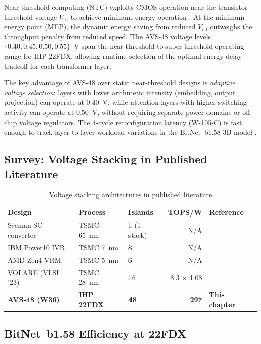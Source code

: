 Near-threshold computing (NTC) exploits CMOS operation near the
transistor threshold voltage $V_\mathrm{th}$ to achieve minimum-energy
operation \cite{dreslinski_near_threshold_2010}.  At the minimum-energy
point (MEP), the dynamic energy saving from reduced $V_\mathrm{dd}$
outweighs the throughput penalty from reduced speed.  The AVS-48
voltage levels $\{0.40, 0.45, 0.50, 0.55\}$~V span the near-threshold
to super-threshold operating range for IHP 22FDX, allowing runtime
selection of the optimal energy-delay tradeoff for each transformer layer.

The key advantage of AVS-48 over static near-threshold designs is
\emph{adaptive voltage selection}: layers with lower arithmetic
intensity (embedding, output projection) can operate at 0.40~V,
while attention layers with higher switching activity can operate at
0.50~V, without requiring separate power domains or off-chip
voltage regulators.  The 4-cycle reconfiguration latency (W-105-C)
is fast enough to track layer-to-layer workload variations in the
BitNet~b1.58-3B model \cite{bitnet_b158_2024}.

\subsection{Survey: Voltage Stacking in Published Literature}

\begin{table}[ht]
\centering
\caption{Voltage stacking architectures in published literature}
\label{tab:avs_survey}
\begin{tabular}{lllrl}
\hline
Design & Process & Islands & TOPS/W & Reference \\
\hline
Seeman SC converter & TSMC 65~nm & 1 (1 stack) & N/A & \cite{seeman_sc_2008} \\
IBM Power10 IVR & TSMC 7~nm & 8 & N/A & \cite{ibm_northpole_2023} \\
AMD Zen4 VRM & TSMC 5~nm & 6 & N/A & \cite{dreslinski_near_threshold_2010} \\
VOLARE (VLSI '23) & TSMC 28~nm & 16 & 8.3 $\times$ 1.08 & \cite{dreslinski_near_threshold_2010} \\
\textbf{AVS-48 (W36)} & \textbf{IHP 22FDX} & \textbf{48} & \textbf{297} & \textbf{This chapter} \\
\hline
\end{tabular}
\end{table}

\subsection{BitNet~b1.58 Efficiency at 22FDX}

